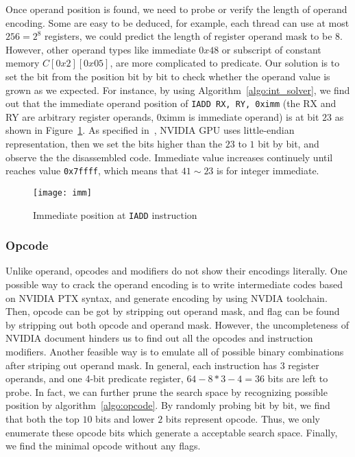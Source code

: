 Once operand position is found, we need to probe or verify the length of operand encoding. Some are easy to be
deduced, for example, each thread can use at most $256=2^{8}$ registers, we could predict the length of register 
operand mask to be $8$.
However, other operand types like immediate $0x48$ or subscript of constant memory $C[0x2][0x05]$, are more complicated 
to predicate. Our solution is to set the bit from the position bit by bit to check whether the operand value is grown 
as we expected. For instance, by using Algorithm~\ref{algo:int_solver}, we find out that the immediate operand position 
of {\tt IADD RX, RY, 0ximm} (the RX and RY are arbitrary register operands, 0ximm is immediate operand) is at bit $23$ 
as shown in Figure~\ref{fig:imm}. As specified in~\cite{cuda2015programming}, NVIDIA GPU uses little-endian 
representation, then we set the bits higher than the $23$ to $1$ bit by bit, and observe the the disassembled code. 
Immediate value increases continuely until reaches value {\tt 0x7ffff}, which means that $41\sim23$ is for integer 
immediate.%

\begin{figure}[htbp]
\begin{center}
\texttt{[image: imm]}
    \caption{Immediate position at {\tt IADD} instruction}
\label{fig:imm}
\end{center}
\end{figure}

\subsubsection{Opcode}
Unlike operand, opcodes and modifiers do not show their encodings literally. One possible way to crack the operand 
encoding is to write intermediate codes
based on NVIDIA PTX syntax, and generate encoding by using NVDIA toolchain.
Then, opcode can be got by stripping out operand mask, and flag can be found by stripping out both opcode and operand 
mask. However, the uncompleteness of NVIDIA document hinders us to find out all the opcodes and instruction modifiers. 
Another feasible way is to emulate all of possible binary combinations after striping out operand mask.
In general, each instruction has $3$ register operands, and one 4-bit predicate register, $64-8*3-4=36$ bits are left 
to probe.
In fact, we can further prune the search space by recognizing possible position by algorithm~\ref{algo:opcode}. By 
randomly probing bit by bit, we find that both the top $10$ bits and lower $2$ bits represent opcode.
Thus, we only enumerate these opcode bits which generate a acceptable search space. Finally, we find 
the minimal opcode without any flags. 

